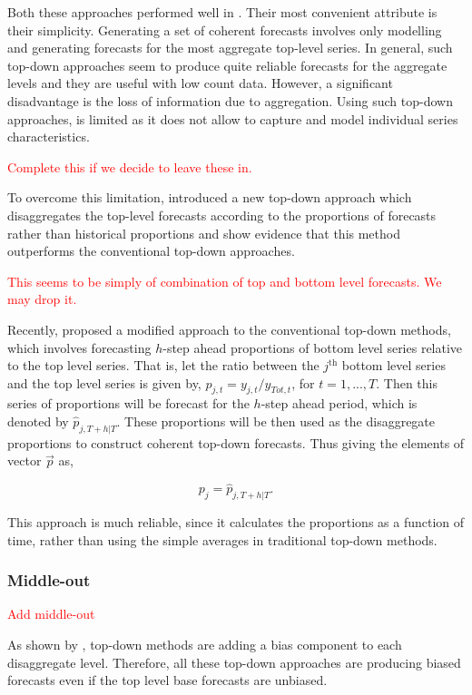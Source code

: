 \documentclass[graybox]{svmult}
\begin{document}
Both these approaches performed well in \cite{gross1990}. Their most convenient attribute is their simplicity. Generating a set of coherent forecasts involves only modelling and generating forecasts for the most aggregate top-level series. In general, such top-down approaches seem to produce quite reliable forecasts for the aggregate levels and they are useful with low count data. However, a significant disadvantage is the loss of information due to aggregation. Using such top-down approaches, is limited as it does not allow to capture and model individual series characteristics.

\textcolor{red}{Complete this if we decide to leave these in.}

To overcome this limitation, \cite{AthEtAl2009} introduced a new top-down approach which disaggregates the top-level forecasts according to the proportions of forecasts rather than historical proportions and show evidence that this method outperforms the conventional top-down approaches.



\textcolor{red}{This seems to be simply of combination of top and bottom level forecasts. We may drop it. }

Recently, \cite{Mircetic2017} proposed a modified approach to the conventional top-down methods, which involves forecasting $h$-step ahead proportions of bottom level series relative to the top level series. That is, let the ratio between the $j^\text{th}$ bottom level series and the top level series is given by, $p_{j,t}=y_{j,t}/y_{Tot,t}$, for $t=1,...,T$. Then this series of proportions will be forecast for the $h$-step ahead period, which is denoted by $\hat{p}_{j,T+h|T}$. These proportions will be then used as the disaggregate proportions to construct coherent top-down forecasts. Thus giving the elements of vector $\vec{p}$ as,

\begin{equation}
p_j = \hat{p}_{j,T+h|T}.
\end{equation}

This approach is much reliable, since it calculates the proportions as a function of time, rather than using the simple averages in traditional top-down methods.

\subsubsection{Middle-out}
\textcolor{red}{Add middle-out}

As shown by \cite{HynEtAl2011}, top-down methods are adding a bias component to each disaggregate level. Therefore, all these top-down approaches are producing biased forecasts even if the top level base forecasts are unbiased.
\end{document}
